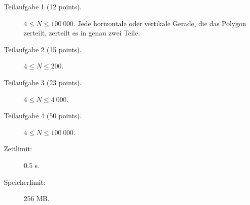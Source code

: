 \documentclass{boi2014-de}
\begin{document}
    \begin{description}
        \item[Teilaufgabe 1 (12 points).] $4 \le N \le 100\ 000$.
        Jede horizontale oder vertikale Gerade, die das Polygon zerteilt, zerteilt es in genau zwei Teile.        
        \item[Teilaufgabe 2 (15 points).] $4 \le N \le 200$.
        \item[Teilaufgabe 3 (23 points).] $4 \le N \le 4\ 000$.
        \item[Teilaufgabe 4 (50 points).] $4 \le N \le 100\ 000$.
    \end{description}

    \Constraints

    \begin{description}
        \item[Zeitlimit:] 0.5 s.
        \item[Speicherlimit:] 256 MB.
    \end{description}
\end{document}
